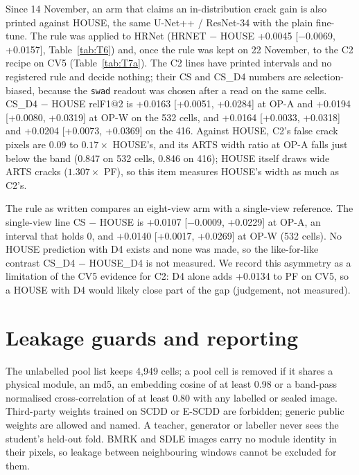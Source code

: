 Since 14 November, an arm that claims an in-distribution crack gain is also printed against HOUSE, the same U-Net++ / ResNet-34 with
the plain fine-tune. The rule was applied to HRNet (HRNET $-$ HOUSE +0.0045 [$-$0.0069, +0.0157], Table~\ref{tab:T6}) and, once the
rule was kept on 22 November, to the C2 recipe on CV5 (Table~\ref{tab:T7a}). The C2 lines have printed intervals and no registered
rule and decide nothing; their CS and CS\_D4 numbers are selection-biased, because the \texttt{swad} readout was chosen after a read on
the same cells. CS\_D4 $-$ HOUSE relF1@2 is +0.0163 [+0.0051, +0.0284] at OP-A and +0.0194 [+0.0080, +0.0319] at OP-W on the 532 cells,
and +0.0164 [+0.0033, +0.0318] and +0.0204 [+0.0073, +0.0369] on the 416. Against HOUSE, C2's false crack pixels are 0.09 to
$0.17\times$ HOUSE's, and its ARTS width ratio at OP-A falls just below the band (0.847 on 532 cells, 0.846 on 416); HOUSE itself draws
wide ARTS cracks ($1.307\times$ PF), so this item measures HOUSE's width as much as C2's.

The rule as written compares an eight-view arm with a single-view reference. The single-view line CS $-$ HOUSE is +0.0107 [$-$0.0009,
+0.0229] at OP-A, an interval that holds 0, and +0.0140 [+0.0017, +0.0269] at OP-W (532 cells). No HOUSE prediction with D4 exists and
none was made, so the like-for-like contrast CS\_D4 $-$ HOUSE\_D4 is not measured. We record this asymmetry as a limitation of the CV5
evidence for C2: D4 alone adds +0.0134 to PF on CV5, so a HOUSE with D4 would likely close part of the gap (judgement, not measured).

\section{Leakage guards and reporting}
\label{sec:protocol-governance}

The unlabelled pool list keeps 4,949 cells; a pool cell is removed if it shares a physical module, an md5, an embedding cosine of at
least 0.98 or a band-pass normalised cross-correlation of at least 0.80 with any labelled or sealed image. Third-party weights trained
on SCDD or E-SCDD are forbidden; generic public weights are allowed and named. A teacher, generator or labeller never sees the
student's held-out fold. BMRK and SDLE images carry no module identity in their pixels, so leakage between neighbouring windows cannot
be excluded for them.

